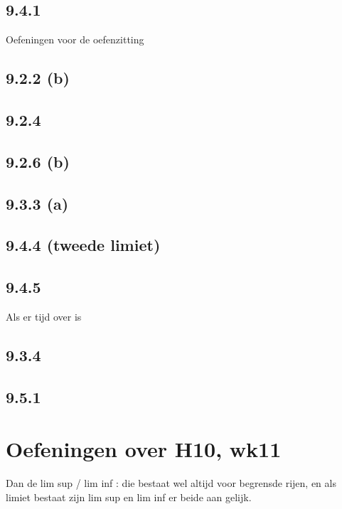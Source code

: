 \documentclass{article}
\begin{document}
\subsection{9.4.1} 



Oefeningen voor de oefenzitting 

\subsection{9.2.2 (b)}

\subsection{9.2.4}

\subsection{9.2.6 (b)}

\subsection{9.3.3 (a)}

\subsection{9.4.4 (tweede limiet)}

\subsection{9.4.5 }

Als er tijd over is 

\subsection{9.3.4}

\subsection{9.5.1}


\section{Oefeningen over H10, wk11}



Dan de lim sup / lim inf : die bestaat wel altijd voor begrensde rijen, en als limiet bestaat zijn lim sup en lim inf er beide aan gelijk. 
\end{document}
